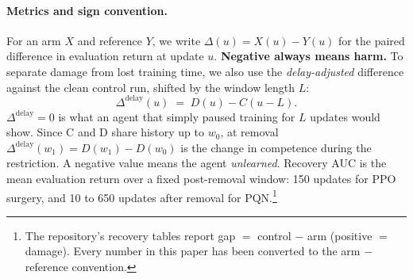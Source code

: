 \documentclass[10pt]{article} %
\newcommand{\Ddel}{\Delta^{\mathrm{delay}}}
\begin{document}
\paragraph{Metrics and sign convention.}
For an arm $X$ and reference $Y$, we write $\Delta(u)=X(u)-Y(u)$ for the paired difference in evaluation return at update $u$. \textbf{Negative always means harm.} To separate damage from lost training time, we also use the \emph{delay-adjusted} difference against the clean control run, shifted by the window length $L$:
\begin{equation}
\Ddel(u) \;=\; D(u) - C(u-L).
\end{equation}
$\Ddel=0$ is what an agent that simply paused training for $L$ updates would show. Since C and D share history up to $w_0$, at removal $\Ddel(w_1)=D(w_1)-D(w_0)$ is the change in competence during the restriction. A negative value means the agent \emph{unlearned}. Recovery AUC is the mean evaluation return over a fixed post-removal window: 150 updates for PPO surgery, and 10 to 650 updates after removal for PQN.\footnote{The repository's recovery tables report gap $=$ control $-$ arm (positive $=$ damage). Every number in this paper has been converted to the arm $-$ reference convention.}
\end{document}
